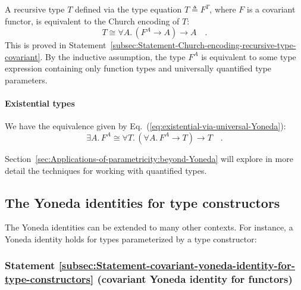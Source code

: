 A recursive type $T$ defined via the type equation $T\triangleq F^{T}$,
where $F$ is a covariant functor, is equivalent to the Church encoding
of $T$:
\[
T\cong\forall A.\,(F^{A}\rightarrow A)\rightarrow A\quad.
\]
This is proved in Statement~\ref{subsec:Statement-Church-encoding-recursive-type-covariant}.
By the inductive assumption, the type $F^{A}$ is equivalent to some
type expression containing only function types and universally quantified
type parameters.

\paragraph{Existential types}

We have the equivalence given by Eq.~(\ref{eq:existential-via-universal-Yoneda}):
\[
\exists A.\,F^{A}\cong\forall T.\,(\forall A.\,F^{A}\rightarrow T)\rightarrow T\quad.
\]

Section~\ref{sec:Applications-of-parametricity:beyond-Yoneda} will
explore in more detail the techniques for working with quantified
types.

\subsection{The Yoneda identities for type constructors\label{subsec:The-Yoneda-identities-for-type-constructors}}

The Yoneda identities can be extended to many other contexts. For
instance, a Yoneda identity holds for types parameterized by a type
constructor:

\subsubsection{Statement \label{subsec:Statement-covariant-yoneda-identity-for-type-constructors}\ref{subsec:Statement-covariant-yoneda-identity-for-type-constructors}
(covariant Yoneda identity for functors)}

